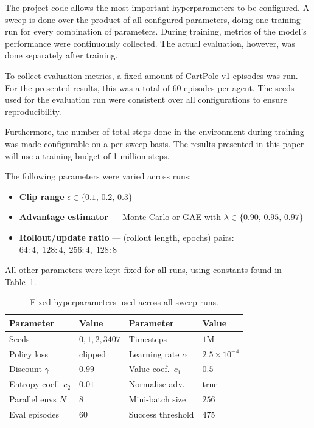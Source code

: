 \documentclass{article}
\begin{document}
The project code allows the most important hyperparameters to be configured. A sweep is done over the product of all configured parameters, doing one training run for every combination of parameters.
During training, metrics of the model's performance were continuously collected. The actual evaluation, however, was done separately after training.

To collect evaluation metrics, a fixed amount of CartPole-v1 episodes was run. For the presented results, this was a total of \(60\) episodes per agent.
The seeds used for the evaluation run were consistent over all configurations to ensure reproducibility.

Furthermore, the number of total steps done in the environment during training was made configurable on a per-sweep basis. The results presented in this paper will use a training budget of 1 million steps.

The following parameters were varied across runs:
\begin{itemize}
  \item \textbf{Clip range} $\epsilon \in \{0.1,\,0.2,\,0.3\}$
  \item \textbf{Advantage estimator} --- Monte Carlo or GAE with $\lambda \in \{0.90,\,0.95,\,0.97\}$
  \item \textbf{Rollout/update ratio} --- (rollout length, epochs) pairs: $64{:}4,\;128{:}4,\;256{:}4,\;128{:}8$
\end{itemize}

All other parameters were kept fixed for all runs, using constants found in Table~\ref{tab:fixed-params}.

\begin{table}[H]
  \caption{Fixed hyperparameters used across all sweep runs.}
  \label{tab:fixed-params}
  \centering
  \normalsize
  \setlength{\tabcolsep}{5pt}
  \renewcommand{\arraystretch}{1.05}
  \begin{tabular}{@{}ll@{\qquad}ll@{}}
    \toprule
    Parameter & Value & Parameter & Value \\
    \midrule
    Seeds & $0,1,2,3407$ & Timesteps & $1\mathrm{M}$ \\
    Policy loss & clipped & Learning rate $\alpha$ & $2.5\times10^{-4}$ \\
    Discount $\gamma$ & $0.99$ & Value coef.\ $c_1$ & $0.5$ \\
    Entropy coef.\ $c_2$ & $0.01$ & Normalise adv.\ & true \\
    Parallel envs $N$ & $8$ & Mini-batch size & $256$ \\
    Eval episodes & $60$ & Success threshold & $475$ \\
    \bottomrule
  \end{tabular}
\end{table}
\end{document}
